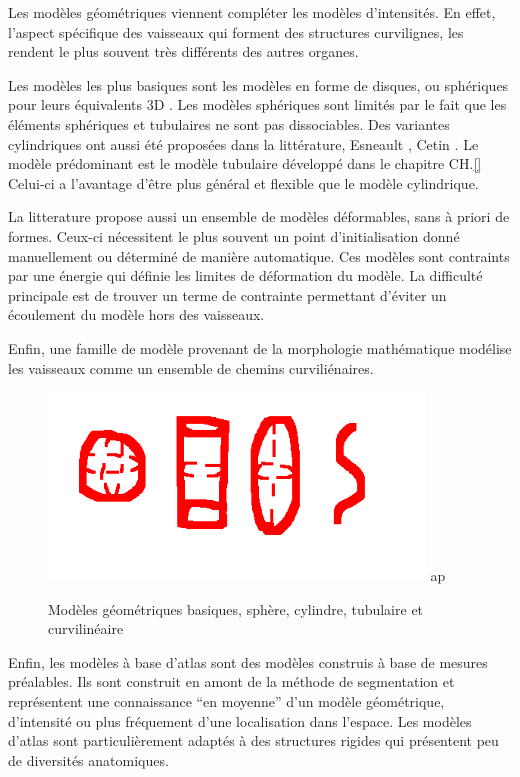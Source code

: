 Les modèles géométriques viennent compléter les modèles d'intensités. En effet, l'aspect spécifique des vaisseaux qui forment des structures curvilignes, les rendent le plus souvent très différents des autres organes.

Les modèles les plus basiques sont les modèles en forme de disques, ou sphériques pour leurs équivalents 3D \cite{Law2008_OOF}. Les modèles sphériques sont limités par le fait que les éléments sphériques et tubulaires ne sont pas dissociables. Des variantes cylindriques ont aussi été proposées dans la littérature, Esneault \cite{Esneault2009_moments_graph_cut}, Cetin \cite{Cetin2015_high_order}. Le modèle prédominant est le modèle tubulaire  développé dans le chapitre CH.\ref{} Celui-ci a l'avantage d'être plus général et flexible que le modèle cylindrique.

La litterature propose aussi un ensemble de modèles déformables, sans à priori de formes. Ceux-ci nécessitent le plus souvent un point d'initialisation donné manuellement ou déterminé de manière automatique. Ces modèles sont contraints par une énergie qui définie les limites de déformation du modèle. La difficulté principale est de trouver un terme de contrainte permettant d'éviter un écoulement du modèle hors des vaisseaux.

Enfin, une famille de modèle provenant de la morphologie mathématique modélise les vaisseaux comme un ensemble de chemins curviliénaires.\cite{Heijmans2005_path_opening}

\begin{figure}
  \centering
  \includegraphics[height=5cm]{Images/geometricModels.png}
ap  \label{fig:geometricModels}
  \caption{Modèles géométriques basiques, sphère, cylindre, tubulaire et curvilinéaire}
\end{figure}

Enfin, les modèles à base d'atlas sont des modèles construis à base de mesures préalables. Ils sont construit en amont de la méthode de segmentation et représentent une connaissance ``en moyenne'' d'un modèle géométrique, d'intensité ou plus fréquement d'une localisation dans l'espace. Les modèles d'atlas sont particulièrement adaptés à des structures rigides qui présentent peu de diversités anatomiques.

